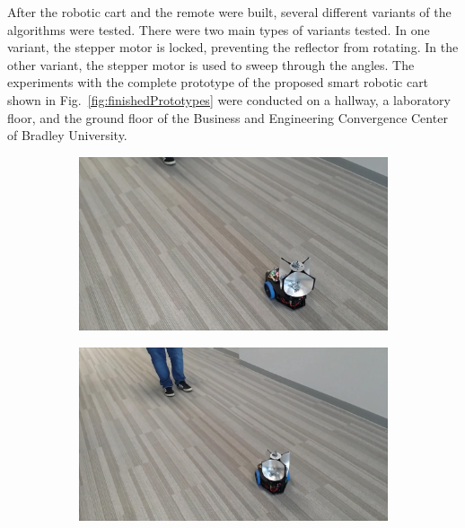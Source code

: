 \documentclass[conference]{IEEEtran}
\begin{document}
After the robotic cart and the remote were built, several different variants of
the algorithms were tested. There were two main types of variants tested. In one
variant, the stepper motor is locked, preventing the reflector from rotating. In
the other variant, the stepper motor is used to sweep through the angles. The
experiments with the complete prototype of the proposed smart robotic cart shown
in Fig.~\ref{fig:finishedPrototypes} were conducted on a hallway, a laboratory
floor, and the ground floor of the Business and Engineering Convergence Center
of Bradley University. %
%
\begin{figure}[htbp]
  \centering
  \begin{subfigure}[b]{0.30\linewidth}
    \centering
    \includegraphics[width=\textwidth]{videos/frames/71.jpeg} 
    \caption{}
    \label{fig:71}
  \end{subfigure}
  \begin{subfigure}[b]{0.30\linewidth}
    \centering
    \includegraphics[width=\textwidth]{videos/frames/141.jpeg} 
    \caption{}
    \label{fig:141}
  \end{subfigure}
  \begin{subfigure}[b]{0.30\linewidth}

\end{subfigure}
\end{figure}
\end{document}
